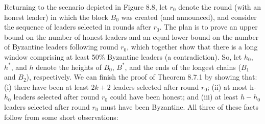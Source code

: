 Returning to the scenario depicted in Figure 8.8, let $r_0$ denote the round (with an honest
leader) in which the block $B_0$ was created (and announced), and consider the sequence of
leaders selected in rounds after $r_0$. The plan is to prove an upper bound on the number
of honest leaders and an equal lower bound on the number of Byzantine leaders following
round $r_0$, which together show that there is a long window comprising at least 50\% Byzantine
leaders (a contradiction). So, let $h_0$, $h^*$, and $h$ denote the heights of $B_0$, $B^*$, and the ends of the longest chains ($B_1$ and $B_2$), respectively. We can finish the proof of Theorem 8.7.1 by showing that: (i) there have been at least $2k + 2$ leaders selected after round $r_0$; (ii) at most
h-$h_0$ leaders selected after round $r_0$ could have been honest; and (iii) at least $h - h_0$ leaders selected after round $r_0$ must have been Byzantine. All three of these facts follow from some
short observations:
